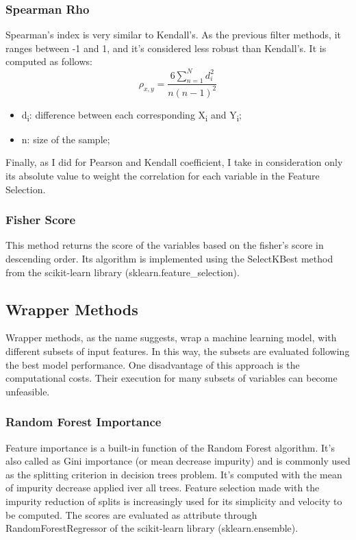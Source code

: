 \subsubsection{Spearman Rho}
Spearman’s index is very similar to Kendall’s. As the previous filter methods, it ranges between -1 and 1, and it's considered less robust than Kendall's.
It is computed as follows:
\begin{equation}
\rho_{x,y} = \frac{6\sum_{n=1}^{N} d_i^2}{n(n-1)^2}
\end{equation}
\begin{itemize}
\item d\textsubscript{i}: difference between each corresponding X\textsubscript{i} and Y\textsubscript{i};
\item n: size of the sample;
\end{itemize}

Finally, as I did for Pearson and Kendall coefficient, I take in consideration only its absolute value to weight the correlation for each variable in the Feature Selection.

\subsubsection{Fisher Score}
This method returns the score of the variables based on the fisher’s score in descending order. \newline
Its algorithm is implemented using the SelectKBest method from the scikit-learn library (sklearn.feature\_selection).
\pagebreak
\subsection{Wrapper Methods}
Wrapper methods, as the name suggests, wrap a machine learning model, with different subsets of input features. In this way, the subsets are evaluated following the best model performance.
One disadvantage of this approach is the computational costs.\newline
Their execution for many subsets of variables can become unfeasible. 
\bigbreak
\subsubsection{Random Forest Importance}
Feature importance is a built-in function of the Random Forest algorithm. It's also called as Gini importance (or mean decrease impurity) and is commonly used as the splitting criterion in decision trees problem. 
It's computed with the mean of impurity decrease applied iver all trees.  
Feature selection made with the impurity reduction of splits is increasingly used for its simplicity and velocity to be computed.
The scores are evaluated as attribute through RandomForestRegressor of the scikit-learn library (sklearn.ensemble).
\bigbreak\bigbreak\bigbreak
